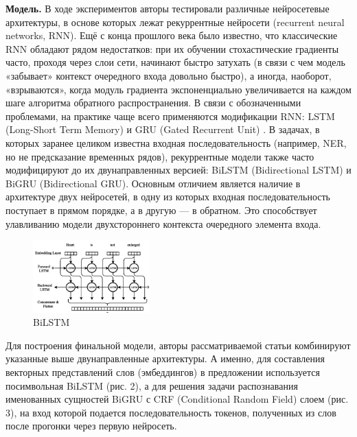 \documentclass[12pt,a4paper]{article}
\begin{document}
\textbf{Модель.} В ходе экспериментов авторы тестировали различные нейросетевые архитектуры, в основе которых лежат рекуррентные нейросети (recurrent neural networks, RNN). Ещё с конца прошлого века было известно, что классические RNN обладают рядом недостатков: при их обучении стохастические градиенты часто, проходя через слои сети, начинают быстро затухать (в связи с чем модель «забывает» контекст очередного входа довольно быстро), а иногда, наоборот, «взрываются», когда модуль градиента экспоненциально увеличивается на каждом шаге алгоритма обратного распространения. В связи с обозначенными проблемами, на практике чаще всего применяются модификации RNN: LSTM (Long-Short Term Memory) \cite{lstm}  и GRU (Gated Recurrent Unit) \cite{gru}. В задачах, в которых заранее целиком известна входная последовательность (например, NER, но не предсказание временных рядов), рекуррентные модели также часто модифицируют до их двунаправленных версией: BiLSTM (Bidirectional LSTM) и BiGRU (Bidirectional GRU). Основным отличием является наличие в архитектуре двух нейросетей, в одну из которых входная последовательность поступает в прямом порядке, а в другую --- в обратном. Это способствует улавливанию модели двухстороннего контекста очередного элемента входа. 

\begin{figure}[H]
\begin{center}
  \includegraphics[width=0.4\textwidth]{bilstm.png}
  \caption{BiLSTM}
\end{center}
\end{figure}

Для построения финальной модели, авторы рассматриваемой статьи комбинируют указанные выше двунаправленные архитектуры. А именно, для составления векторных представлений слов (эмбеддингов) в предложении используется посимвольная BiLSTM (рис. 2), а для решения задачи распознавания именованных сущностей BiGRU с CRF\cite{crf} (Conditional Random Field) слоем (рис. 3), на вход которой подается последовательность токенов, полученных из слов после прогонки через первую нейросеть.
\end{document}
